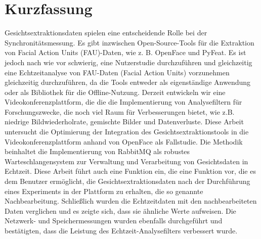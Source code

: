 \chapter{Kurzfassung}\label{chapter:kurzfassung}

Gesichtsextraktionsdaten spielen eine entscheidende Rolle bei der Synchronitätsmessung. 
Es gibt inzwischen Open-Source-Tools für die Extraktion von Facial Action Units (FAU)-Daten,
 wie z. B. OpenFace und PyFeat.
Es ist jedoch nach wie vor schwierig, eine Nutzerstudie durchzuführen und gleichzeitig eine Echtzeitanalyse von FAU-Daten (Facial Action Units) vorzunehmen
gleichzeitig durchzuführen, da die Tools entweder als eigenständige Anwendung 
oder als Bibliothek für die Offline-Nutzung.
Derzeit entwickeln wir eine Videokonferenzplattform, die 
die die Implementierung von Analysefiltern
für Forschungszwecke, die noch viel Raum für Verbesserungen bietet, 
wie z.B. niedrige Bildwiederholrate, gemischte Bilder und Datenverluste.
Diese Arbeit untersucht die Optimierung der Integration des Gesichtsextraktionstools 
in die Videokonferenzplattform anhand von OpenFace als Fallstudie.
Die Methodik beinhaltet die Implementierung von RabbitMQ als robustes Warteschlangensystem zur Verwaltung und Verarbeitung von Gesichtsdaten in Echtzeit.
Diese Arbeit führt auch eine Funktion ein, die 
eine Funktion vor, die es dem Benutzer ermöglicht, die Gesichtsextraktionsdaten nach der Durchführung eines Experiments in der Plattform zu erhalten, die so genannte Nachbearbeitung.
Schließlich wurden die Echtzeitdaten mit den nachbearbeiteten Daten verglichen 
und es zeigte sich, dass sie ähnliche Werte aufweisen.
Die Netzwerk- und Speichermessungen wurden ebenfalls durchgeführt und bestätigten, dass die Leistung des Echtzeit-Analysefilters verbessert wurde.